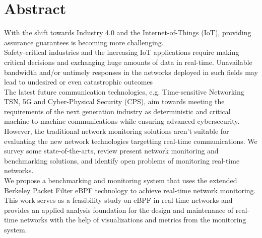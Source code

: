 \chapter*{Abstract}

With the shift towards Industry 4.0 and the Internet-of-Things (IoT), providing assurance guarantees is becoming more challenging.\\
Safety-critical industries and the increasing IoT applications require making critical decisions and exchanging huge amounts of data in real-time.
Unavailable bandwidth and/or untimely responses in the networks deployed in such fields may lead to undesired or even catastrophic outcomes\\
The latest future communication technologies, e.g. Time-sensitive Networking TSN, 5G and Cyber-Physical Security (CPS),
aim towards meeting the requirements of the next generation industry as deterministic and critical machine-to-machine
communications while ensuring advanced cybersecurity.\\
However, the traditional network monitoring solutions aren't suitable for evaluating the new network technologies targetting real-time communications.
We survey some state-of-the-arts, review present network monitoring and benchmarking solutions, and identify open problems of monitoring real-time networks.\\
We propose a benchmarking and monitoring system that uses the extended Berkeley Packet Filter eBPF technology to achieve real-time network monitoring.\\
This work serves as a feasibility study on eBPF in real-time networks and provides an applied analysis foundation for the design and maintenance of real-time networks
with the help of visualizations and metrics from the monitoring system.\\


